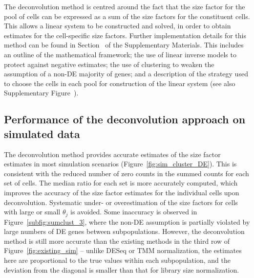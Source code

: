 \documentclass{article}
\begin{document}
The deconvolution method is centred around the fact that the size factor for the pool of cells can be expressed as a sum of the size factors for the constituent cells.
This allows a linear system to be constructed and solved, in order to obtain estimates for the cell-specific size factors.
Further implementation details for this method can be found in Section~\suppdeconv{} of the Supplementary Materials.
This includes an outline of the mathematical framework; 
    the use of linear inverse models to protect against negative estimates;
    the use of clustering to weaken the assumption of a non-DE majority of genes;
    and a description of the strategy used to choose the cells in each pool for construction of the linear system (see also Supplementary Figure~\suppring{}).

\subsection{Performance of the deconvolution approach on simulated data}
The deconvolution method provides accurate estimates of the size factor estimates in most simulation scenarios (Figure~\ref{fig:sim_cluster_DE}).
This is consistent with the reduced number of zero counts in the summed counts for each set of cells.
The median ratio for each set is more accurately computed, which improves the accuracy of the size factor estimates for the individual cells upon deconvolution.
Systematic under- or overestimation of the size factors for cells with large or small $\theta_j$ is avoided.
Some inaccuracy is observed in Figure~\ref{subfig:sumclust_3}, where the non-DE assumption is partially violated by large numbers of DE genes between subpopulations.
However, the deconvolution method is still more accurate than the existing methods in the third row of Figure~\ref{fig:existing_sim}
    -- unlike DESeq or TMM normalization, the estimates here are proportional to the true values within each subpopulation, 
       and the deviation from the diagonal is smaller than that for library size normalization.
\end{document}
